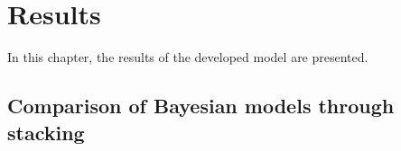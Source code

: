 \chapter{Results}

In this chapter, the results of the developed model are presented.





\section{Comparison of Bayesian models through stacking}


